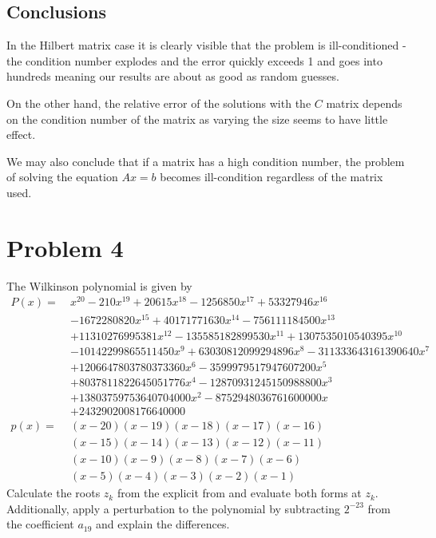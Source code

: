 \documentclass[a4paper, 12pt]{article}
\begin{document}
\subsection{Conclusions}
In the Hilbert matrix case it is clearly visible that the problem is
ill-conditioned - the condition number explodes and the error quickly exceeds 1
and goes into hundreds meaning our results are about as good as random guesses.

On the other hand, the relative error of the solutions with the $C$ matrix
depends on the condition number of the matrix as varying the size seems to have
little effect.

We may also conclude that if a matrix has a high condition number, the problem
of solving the equation $Ax = b$ becomes ill-condition regardless of the matrix
used.

\section{Problem 4}
The Wilkinson polynomial is given by
\begin{align*}
P(x) = \ &x^{20} - 210x^{19} + 20615x^{18} - 1256850x^{17} + 53327946x^{16}
\tag{explicit form}\\
&- 1672280820x^{15} + 40171771630x^{14} - 756111184500x^{13} \\
&+ 11310276995381x^{12} - 135585182899530x^{11} +1307535010540395x^{10} \\
&- 10142299865511450x^{9} + 63030812099294896x^{8} - 311333643161390640x^{7} \\
&+ 1206647803780373360x^{6} - 3599979517947607200x^{5} \\
&+ 8037811822645051776x^{4} - 12870931245150988800x^{3} \\
&+ 13803759753640704000x^{2} - 8752948036761600000x \\
&+ 2432902008176640000 \\
p(x) = \ &(x - 20)(x - 19)(x - 18)(x - 17)(x - 16) \tag{factor form} \\
& (x - 15)(x - 14)(x - 13)(x - 12)(x - 11) \\
& (x - 10)(x - 9)(x - 8)(x - 7)(x - 6) \\
& (x - 5)(x - 4)(x - 3)(x - 2)(x - 1)
\end{align*}
Calculate the roots $z_k$ from the explicit from and evaluate both forms at
$z_k$. Additionally, apply a perturbation to the polynomial by subtracting
$2^{-23}$ from the coefficient $a_19$ and explain the differences.
\end{document}
